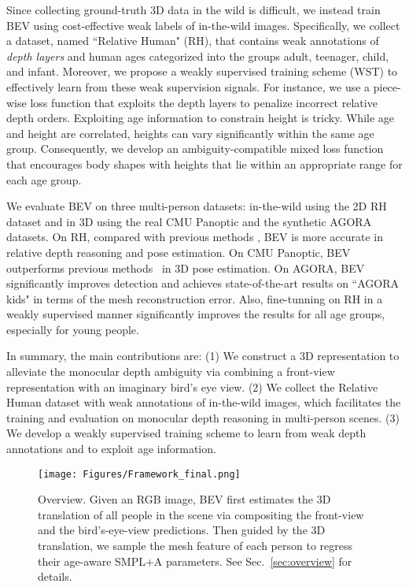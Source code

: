 \documentclass[10pt,twocolumn,letterpaper]{article}
\begin{document}
Since collecting ground-truth 3D data in the wild is difficult, we instead train BEV using cost-effective weak labels of in-the-wild images. 
Specifically, we collect a dataset, named ``Relative Human" (RH), that contains weak annotations of {\em depth layers} and human ages categorized into the groups adult, teenager, child, and infant.
Moreover, we propose a weakly supervised training scheme (WST) to effectively learn from these weak supervision signals.
For instance, we use a piece-wise loss function that exploits the depth layers to penalize incorrect relative depth orders.
Exploiting age information to constrain height is tricky.
While age and height are correlated, heights can vary significantly within the same age group.
Consequently, we develop an ambiguity-compatible mixed loss function that encourages body shapes with heights that lie within an appropriate range for each age group.

We evaluate BEV on three multi-person datasets: in-the-wild using the 2D RH dataset and in 3D using the real CMU Panoptic \cite{cmu_panoptic} and the synthetic AGORA \cite{patel2021agora} datasets.
On RH, compared with previous methods \cite{moon2019camera,jiang2020coherent,zhen2020smap,wang2020hmor}, BEV is more accurate in relative depth reasoning and pose estimation. 
On CMU Panoptic, BEV outperforms previous methods~\cite{zanfir2018deep,zanfir2018monocular,jiang2020coherent,romp,choi20223dcrowdnet} in 3D pose estimation.
On AGORA, BEV significantly improves detection and achieves state-of-the-art results on ``AGORA kids" in terms of the mesh reconstruction error.
Also, fine-tunning on RH in a weakly supervised manner significantly improves the results for all age groups, especially for young people.

In summary, the main contributions are: (1)  We construct a 3D representation to alleviate the monocular depth ambiguity via combining a front-view representation with an imaginary bird's eye view.
(2) We collect the Relative Human dataset with weak annotations of in-the-wild images, which facilitates the training and evaluation on monocular depth reasoning in multi-person scenes.
(3) We develop a weakly supervised training scheme to learn from weak depth annotations and to exploit age information.



\begin{figure*}[t]
	\centerline{\texttt{[image: Figures/Framework\_final.png]}}
	\vspace{-3mm}
	\caption{Overview. Given an RGB image, BEV first estimates the 3D translation of all people in the scene via compositing the front-view and the bird's-eye-view predictions. Then guided by the 3D translation, we sample the mesh feature of each person to regress their age-aware SMPL+A parameters. See Sec.~\ref{sec:overview} for details.}
	\label{fig:framework}
\end{figure*}
\end{document}

